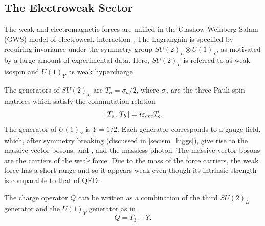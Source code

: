 \subsection{The Electroweak Sector}\label{sec:ew_sector}

The weak and electromagnetic forces are unified in the Glashow-Weinberg-Salam (GWS) model of electroweak interaction \cite{Glashow:1961tr,Weinberg:1967tq,Salam:1968rm}.
The Lagrangain is specified by requiring invariance under the symmetry group $SU(2)_L \otimes U(1)_Y$, as motivated by a large amount of experimental data.
Here, $SU(2)_L$ is referred to as weak isospin and $U(1)_Y$ as weak hypercharge.

The generators of $SU(2)_L$ are $T_a = \sigma_a/2$, where $\sigma_a$ are the three Pauli spin matrices which satisfy the commutation relation 
%
\begin{equation}
[\; T_a,\,T_b\,] = i \varepsilon_{abc} T_c .
\end{equation}
%
The generator of $U(1)_Y$ is $Y = 1/2$.
Each generator corresponds to a gauge field, which, after symmetry breaking (discussed in \cref{sec:sm_higgs}), give rise to the massive vector bosons, \Wpm and \Zboson, and the massless photon.
The massive vector bosons are the carriers of the weak force.%
Due to the mass of the force carriers, the weak force has a short range and so it appears weak even though its intrinsic strength is comparable to that of QED.

The charge operator $Q$ can be written as a combination of the third $SU(2)_L$ generator and the $U(1)_Y$ generator as in
%
\begin{equation}\label{eq:charge_operator}
  Q = T_3 + Y .
\end{equation}
%

